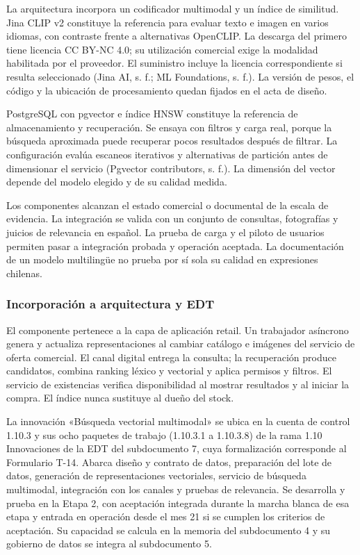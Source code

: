 \documentclass[11pt]{article}
\begin{document}
La arquitectura incorpora un codificador multimodal y un índice de similitud. Jina CLIP v2 constituye la referencia para evaluar texto e imagen en varios idiomas, con contraste frente a alternativas OpenCLIP. La descarga del primero tiene licencia CC BY-NC 4.0; su utilización comercial exige la modalidad habilitada por el proveedor. El suministro incluye la licencia correspondiente si resulta seleccionado (Jina AI, s. f.; ML Foundations, s. f.). La versión de pesos, el código y la ubicación de procesamiento quedan fijados en el acta de diseño.

PostgreSQL con pgvector e índice HNSW constituye la referencia de almacenamiento y recuperación. Se ensaya con filtros y carga real, porque la búsqueda aproximada puede recuperar pocos resultados después de filtrar. La configuración evalúa escaneos iterativos y alternativas de partición antes de dimensionar el servicio (Pgvector contributors, s. f.). La dimensión del vector depende del modelo elegido y de su calidad medida.

Los componentes alcanzan el estado comercial o documental de la escala de evidencia. La integración se valida con un conjunto de consultas, fotografías y juicios de relevancia en español. La prueba de carga y el piloto de usuarios permiten pasar a integración probada y operación aceptada. La documentación de un modelo multilingüe no prueba por sí sola su calidad en expresiones chilenas.

\subsubsection{Incorporación a arquitectura y EDT}\label{incorporaciuxf3n-a-arquitectura-y-edt-2}

El componente pertenece a la capa de aplicación retail. Un trabajador asíncrono genera y actualiza representaciones al cambiar catálogo e imágenes del servicio de oferta comercial. El canal digital entrega la consulta; la recuperación produce candidatos, combina ranking léxico y vectorial y aplica permisos y filtros. El servicio de existencias verifica disponibilidad al mostrar resultados y al iniciar la compra. El índice nunca sustituye al dueño del stock.

La innovación «Búsqueda vectorial multimodal» se ubica en la cuenta de control 1.10.3 y sus ocho paquetes de trabajo (1.10.3.1 a 1.10.3.8) de la rama 1.10 Innovaciones de la EDT del subdocumento 7, cuya formalización corresponde al Formulario T-14. Abarca diseño y contrato de datos, preparación del lote de datos, generación de representaciones vectoriales, servicio de búsqueda multimodal, integración con los canales y pruebas de relevancia. Se desarrolla y prueba en la Etapa 2, con aceptación integrada durante la marcha blanca de esa etapa y entrada en operación desde el mes 21 si se cumplen los criterios de aceptación. Su capacidad se calcula en la memoria del subdocumento 4 y su gobierno de datos se integra al subdocumento 5.
\end{document}
